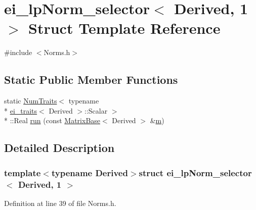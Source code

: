 \hypertarget{structei__lp_norm__selector_3_01_derived_00_011_01_4}{\section{ei\-\_\-lp\-Norm\-\_\-selector$<$ Derived, 1 $>$ Struct Template Reference}
\label{structei__lp_norm__selector_3_01_derived_00_011_01_4}
}


{\ttfamily \#include $<$Norms.\-h$>$}

\subsection*{Static Public Member Functions}
\begin{DoxyCompactItemize}
\item 
static \hyperlink{struct_num_traits}{Num\-Traits}$<$ typename \\*
\hyperlink{structei__traits}{ei\-\_\-traits}$<$ Derived $>$\-::Scalar $>$\\*
\-::Real \hyperlink{structei__lp_norm__selector_3_01_derived_00_011_01_4_af86c2379c6603ef72e4c1756f0d0ce92}{run} (const \hyperlink{class_matrix_base}{Matrix\-Base}$<$ Derived $>$ \&\hyperlink{glext_8h_af593500c283bf1a787a6f947f503a5c2}{m})
\end{DoxyCompactItemize}


\subsection{Detailed Description}
\subsubsection*{template$<$typename Derived$>$struct ei\-\_\-lp\-Norm\-\_\-selector$<$ Derived, 1 $>$}



Definition at line 39 of file Norms.\-h.



